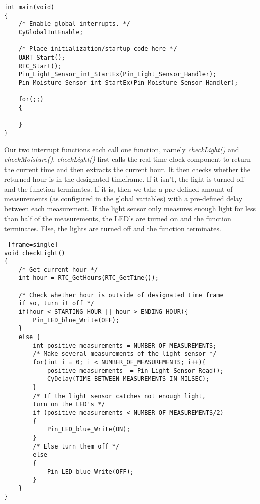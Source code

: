 \documentclass[11pt, oneside]{scrartcl}   	%
\begin{document}
\begin{lstlisting}[frame=single]
int main(void)
{
    /* Enable global interrupts. */   
    CyGlobalIntEnable; 

    /* Place initialization/startup code here */
    UART_Start();
    RTC_Start();
    Pin_Light_Sensor_int_StartEx(Pin_Light_Sensor_Handler);
    Pin_Moisture_Sensor_int_StartEx(Pin_Moisture_Sensor_Handler);
    
    for(;;)
    {
        
    }
}
\end{lstlisting}

Our two interrupt functions each call one function, namely \emph{checkLight()} and \emph{checkMoisture()}.
\emph{checkLight()} first calls the real-time clock component to return the current time and then extracts the current hour. It then checks whether the returned hour is in the designated timeframe. If it isn't, the light is turned off and the function terminates. If it is, then we take a pre-defined amount of measurements (as configured in the global variables) with a pre-defined delay between each measurement. If the light sensor only measures enough light for less than half of the measurements, the LED's are turned on and the function terminates. Else, the lights are turned off and the function terminates.

\begin{lstlisting} [frame=single]
void checkLight()
{
    /* Get current hour */
    int hour = RTC_GetHours(RTC_GetTime());
    
    /* Check whether hour is outside of designated time frame 
    if so, turn it off */
    if(hour < STARTING_HOUR || hour > ENDING_HOUR){
        Pin_LED_blue_Write(OFF);
    }
    else {
        int positive_measurements = NUMBER_OF_MEASUREMENTS;
        /* Make several measurements of the light sensor */
        for(int i = 0; i < NUMBER_OF_MEASUREMENTS; i++){
            positive_measurements -= Pin_Light_Sensor_Read();
            CyDelay(TIME_BETWEEN_MEASUREMENTS_IN_MILSEC);
        }
        /* If the light sensor catches not enough light, 
        turn on the LED's */
        if (positive_measurements < NUMBER_OF_MEASUREMENTS/2)
        {
            Pin_LED_blue_Write(ON);   
        } 
        /* Else turn them off */
        else 
        {
            Pin_LED_blue_Write(OFF);
        }
    }
}
\end{lstlisting}
\end{document}
